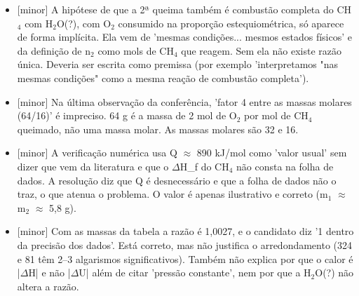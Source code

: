\documentclass{article}%
\begin{document}
\begin{itemize}%
\item%
{[}minor{]} A hipótese de que a 2ª queima também é combustão completa do CH$_{4}$ com H$_{2}$O(?), com O$_{2}$ consumido na proporção estequiométrica, só aparece de forma implícita. Ela vem de 'mesmas condições... mesmos estados físicos' e da definição de n$_{2}$ como mols de CH$_{4}$ que reagem. Sem ela não existe razão única. Deveria ser escrita como premissa (por exemplo 'interpretamos "nas mesmas condições" como a mesma reação de combustão completa').%
\item%
{[}minor{]} Na última observação da conferência, 'fator 4 entre as massas molares (64/16)' é impreciso. 64 g é a massa de 2 mol de O$_{2}$ por mol de CH$_{4}$ queimado, não uma massa molar. As massas molares são 32 e 16.%
\item%
{[}minor{]} A verificação numérica usa Q $\approx$ 890 kJ/mol como 'valor usual' sem dizer que vem da literatura e que o $\Delta$H\_f do CH$_{4}$ não consta na folha de dados. A resolução diz que Q é desnecessário e que a folha de dados não o traz, o que atenua o problema. O valor é apenas ilustrativo e correto (m$_{1}$ $\approx$ m$_{2}$ $\approx$ 5,8 g).%
\item%
{[}minor{]} Com as massas da tabela a razão é 1,0027, e o candidato diz '1 dentro da precisão dos dados'. Está correto, mas não justifica o arredondamento (324 e 81 têm 2--3 algarismos significativos). Também não explica por que o calor é |$\Delta$H| e não |$\Delta$U| além de citar 'pressão constante', nem por que a H$_{2}$O(?) não altera a razão.%
\end{itemize}%
\end{document}
